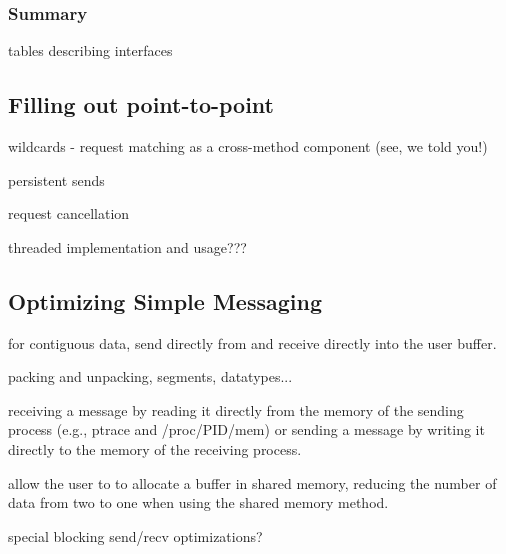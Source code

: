 \subsubsection{Summary}

tables describing interfaces


\subsection{Filling out point-to-point}

wildcards
- request matching as a cross-method component (see, we told you!)

persistent sends

request cancellation

threaded implementation and usage???


\subsection{Optimizing Simple Messaging}


for contiguous data, send directly from and receive directly into the
user buffer.

packing and unpacking, segments, datatypes...

receiving a message by reading it directly from the memory of the
sending process (e.g., ptrace and /proc/PID/mem) or sending a message
by writing it directly to the memory of the receiving process.

allow the user to  to allocate a buffer in shared
memory, reducing the number of data from two to one when using the
shared memory method.

special blocking send/recv optimizations?


